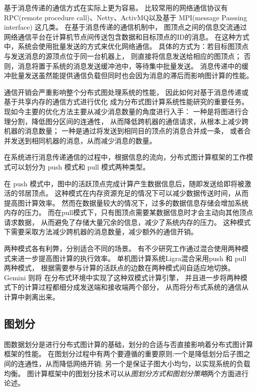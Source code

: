 基于消息传递的通信方式在实际上更为容易。
比较常用的网络通信协议有
RPC(remote procedure call)\cite{rpc}、Netty\cite{netty}、ActivMQ\cite{activemq}以及基于 MPI(message Passsing interface)\cite{mpi}
这几类。
在基于消息传递的通信机制中，
图顶点之间的信息交流通过网络通信平台在计算机节点间传送包含数据和目标顶点的ID的消息。
在这种方式中，系统会使用批量发送的方式来优化网络通信。
具体的方式为：若目标图顶点与发送消息的源顶点位于同一台机器上，
则直接将信息发送给相应的图顶点；
否则，消息将置于系统的消息发送缓冲池中，等待集中批量发送。
消息传递中的缓冲批量发送虽然能提供通信负载但同时也会因为消息的滞后而影响图计算的性能。


通信开销会严重影响整个分布式图处理系统的性能，
因此如何对基于消息传递或基于共享内存的通信方式进行优化
成为分布式图计算系统性能研究的重要任务。
现如今主要的优化方法主要从减少消息数量的角度进行入手：
一种是将图进行合理分割，降低图分区间的连通性，
从而降低跨机器的通信请求，从根本上减少跨机器的消息数量；
一种是通过将发送到相同目的顶点的消息合并成一条，
或者合并发送到相同机器的消息，从而减少消息的数量。


在系统进行消息传递通信的过程中，根据信息的流向，分布式图计算框架的工作模式可以划分为 push 模式和 pull 模式两种类型。

在 push 模式中，图中的活跃顶点完成计算产生数据信息后，随即发送给即将被激活的邻居顶点。
这种模式在内存资源充足的情况下可以减少数据传送时间，从而提高图计算效率。
然而在数据量较大的情况下，过多的数据信息存储会增加系统内存的压力。
而在pull模式下，只有图顶点需要某数据信息时才会主动向其他顶点请求数据，
从而避免了存储大量冗余的信息，减少了系统内存的压力。
这种模式下需要采取方法减少跨机器的消息数量，减少额外的通信开销。

两种模式各有利弊，分别适合不同的场景。
有不少研究工作通过混合使用两种模式来进一步提高图计算的执行效率。
单机图计算系统Ligra\cite{Shun@PPoPP13}混合采用push 和 pull 两种模式，
根据需要参与计算的活跃点的边数在两种模式间自适应地切换。
Gemini\cite{Zhu@OSDI16} 则将
在分布式环境中实现了这种双模式计算引擎，
并且进一步将两种模式下的计算过程都细分成发送端和接收端两个部分，
从而将分布式系统的通信从计算中剥离出来。

\subsection{图划分}

图数据划分是进行分布式图计算的基础，划分的合适与否直接影响着分布式图计算框架的性能。
在图划分过程中有两个要遵循的重要原则:一个是降低划分后子图之间的连通性，从而降低网络开销;
另一个是保证子图大小均匀，以实现系统的负载均衡。
图计算框架中的图划分技术可以从\textit{图划分方式和图划分策略}两个方面进行论述。

